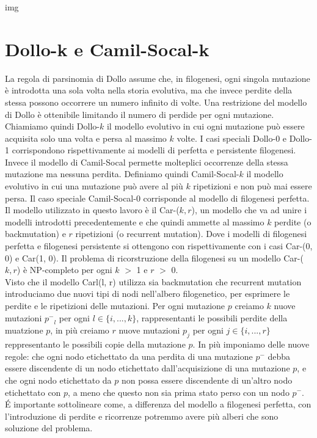 \documentclass{report}
\begin{document}
  img

\section{Dollo-k e Camil-Socal-k}
  La regola di parsinomia di Dollo assume che, in filogenesi, ogni singola mutazione è introdotta una sola volta nella storia evolutiva, ma che invece perdite della stessa possono occorrere un numero infinito di volte. Una restrizione del modello di Dollo è ottenibile limitando il numero di perdide per ogni mutazione. Chiamiamo quindi Dollo-$k$ il modello evolutivo in cui ogni mutazione può essere acquisita solo una volta e persa al massimo $k$ volte. I casi speciali Dollo-0 e Dollo-1 corrispondono rispettivamente ai modelli di perfetta e persistente filogenesi.\\
  Invece il modello di Camil-Socal permette molteplici occorrenze della stessa mutazione ma nessuna perdita. Definiamo quindi Camil-Socal-$k$ il modello evolutivo in cui una mutazione può avere al più $k$ ripetizioni e non può mai essere persa. Il caso speciale Camil-Socal-0 corrisponde al modello di filogenesi perfetta.\\
  Il modello utilizzato in questo lavoro è il Car-($k, r$), un modello che va ad unire i modelli introdotti precedentemente e che quindi ammette al massimo $k$ perdite (o backmutation) e $r$ ripetizioni (o recurrent mutation). Dove i modelli di filogenesi perfetta e filogenesi persistente si ottengono con rispettivamente con i casi Car-(0, 0) e Car(1, 0). Il problema di ricorstruzione della filogenesi su un modello Car-($k, r$) è NP-completo per ogni $k$ $>$ 1 e $r$ $>$ 0.\\
  Visto che il modello Carl(l, r) utilizza sia backmutation che recurrent mutation introduciamo due nuovi tipi di nodi nell'albero filogenetico, per esprimere le perdite e le ripetizioni delle mutazioni. Per ogni mutazione $p$ creiamo $k$ nuove mutazioni ${p^-}_{l}$ per ogni $l\in\{i, ..., k\}$, rappresentanti le possibili perdite della muatzione $p$, in più creiamo $r$ nuove mutazioni ${p}_{j}$ per ogni $j\in\{i, ..., r\}$ reppresentanto le possibili copie della mutazione $p$.
  In più imponiamo delle nuove regole: che ogni nodo etichettato da una perdita di una mutazione $p^-$ debba essere discendente di un nodo etichettato dall'acquisizione di una mutazione $p$, e che ogni nodo etichettato da $p$ non possa essere discendente di un'altro nodo etichettato con $p$, a meno che questo non sia prima stato perso con un nodo $p^-$.\\
  \'E importante sottolineare come, a differenza del modello a filogenesi perfetta, con l'introduzione di perdite e ricorrenze potremmo avere più alberi che sono soluzione del problema.
\end{document}
